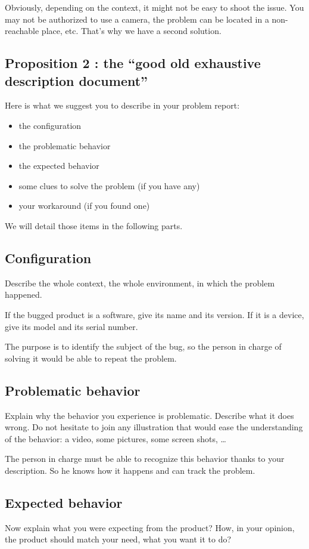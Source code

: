 Obviously, depending on the context, it might not be easy to shoot the issue. You may not be authorized to use a camera, the problem can be located in a non-reachable place, etc. That’s why we have a second solution.

\subsection{Proposition 2 : the “good old exhaustive description document”}
Here is what we suggest you to describe in your problem report:
\begin{itemize}
    \item the configuration
    \item the problematic behavior
    \item the expected behavior
    \item some clues to solve the problem (if you have any)
    \item your workaround (if you found one)
\end{itemize}

We will detail those items in the following parts.

\subsection{Configuration}
Describe the whole context, the whole environment, in which the problem happened.

If the bugged product is a software, give its name and its version.
If it is a device, give its model and its serial number.

The purpose is to identify the subject of the bug, so the person in charge of solving it would be able to repeat the problem.

\subsection{Problematic behavior}
Explain why the behavior you experience is problematic. Describe what it does wrong. Do not hesitate to join any illustration that would ease the understanding of the behavior: a video, some pictures, some screen shots, …

The person in charge must be able to recognize this behavior thanks to your description. So he knows how it happens and can track the problem.

\subsection{Expected behavior}
Now explain what you were expecting from the product? How, in your opinion, the product should match your need, what you want it to do?

